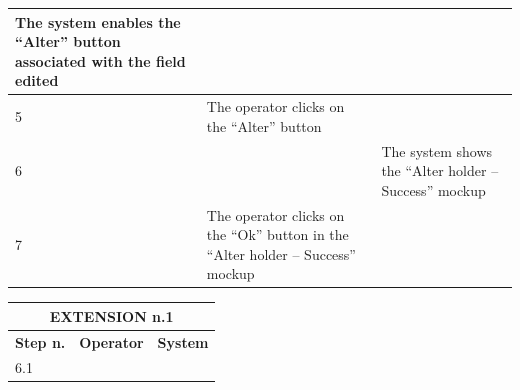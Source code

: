 {{{\begin{table}[h]
\begin{tabular}{|p{2cm}|p{6cm}|p{6cm}|}
				\vspace{1mm} The system enables the “Alter” button associated with the field edited\vspace{1mm} \\
			\hline
				\vspace{1mm} 5 \vspace{1mm} &
				\vspace{1mm} The operator clicks on the “Alter” button\vspace{1mm} & 
				\vspace{1mm} \vspace{1mm} \\
			\hline
				\vspace{1mm} 6 \vspace{1mm} &
				\vspace{1mm} \vspace{1mm} & 
				\vspace{1mm} The system shows  the “Alter holder – Success”  mockup\vspace{1mm} \\
			\hline
				\vspace{1mm} 7 \vspace{1mm} &
				\vspace{1mm} The operator clicks on the “Ok” button in the “Alter holder – Success”  mockup\vspace{1mm} & 
				\vspace{1mm} \vspace{1mm} \\
			\hline
			\end{tabular}
			\end{table}
			\begin{table}[h]
			\begin{tabular}{|p{2cm}|p{6cm}|p{6cm}|}
			\hline
				\multicolumn{3}{|c|}{EXTENSION n.1} \\
			\hline
				\centering \vspace{1mm} \bfseries{Step n.} \vspace{1mm} & \vspace{1mm} \bfseries{Operator} \vspace{1mm} & \vspace{1mm} \bfseries{System} \vspace{1mm}\\
			\hline
				\vspace{1mm} 6.1 \vspace{1mm} &
				\vspace{1mm} \vspace{1mm} & 

\end{tabular}
\end{table}}}}
